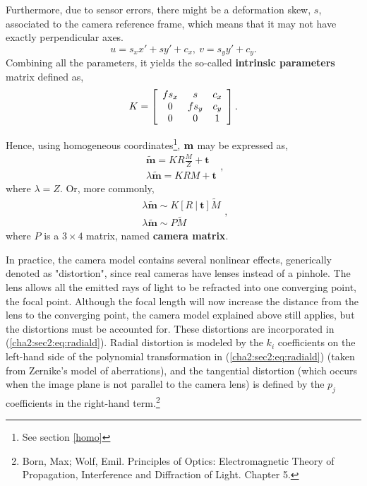 \begin{enumerate}
	Furthermore, due to sensor errors, there might be a deformation skew, $s$, associated to the camera reference frame, which means that it may not have exactly perpendicular axes.
	\begin{equation}
	\label{cha2:sec2:eq:trisimilar}
	u = s_x x' + sy' + c_x, \ v = s_y y' + c_y.
	\end{equation}
	Combining all the parameters, it yields the so-called \textbf{intrinsic parameters} matrix defined as,
	\begin{equation}
	\label{sec2:eq:kmatrix}
	K = \left[ 
	\begin{array} { c c c } 
	f s_x & s     & c_x \\ 
	0 	  & f s_y & c_y \\ 
	0     & 0     & 1   
	\end{array} 
	\right].
	\end{equation}
\end{enumerate}
Hence, using homogeneous coordinates\footnote{See section \ref{homo}}, $\bf m$ may be expressed as,
\begin{equation}
\begin{array} { l } 
\mathbf{\widetilde{m}} = K R \frac{M}{Z} + \mathbf{t} \\
\lambda \mathbf{\widetilde{m}} = KR M +  \mathbf{t} 
\end{array},
\end{equation}
where $\lambda = Z$. Or, more commonly, 
\begin{equation}
\begin{array} { l } { \lambda \mathbf{\widetilde{m}} \sim K [ R \ | \ \mathbf{t} ] \widetilde { M } } \\ { \lambda \mathbf{\widetilde{ m }} \sim P \widetilde { M } } \end{array},
\end{equation}
where $P$ is a $3\times4$ matrix, named \textbf{camera matrix}.
	
In practice, the camera model contains several nonlinear effects, generically denoted as "distortion", since real cameras have lenses instead of a pinhole. The lens allows all the emitted rays of light to be refracted into one converging point, the focal point. Although the focal length will now increase the distance from the lens to the converging point, the camera model explained above still applies, but the distortions must be accounted for. These distortions are incorporated in (\ref{cha2:sec2:eq:radiald}). Radial distortion is modeled by the $k_i$ coefficients on the left-hand side of the polynomial transformation in (\ref{cha2:sec2:eq:radiald}) (taken from Zernike's model of aberrations), and the tangential distortion (which occurs when the image plane is not parallel to the camera lens) is defined by the $p_j$ coefficients in the right-hand term.\footnote{Born, Max; Wolf, Emil. Principles of Optics: Electromagnetic Theory of Propagation, Interference and Diffraction of Light. Chapter 5.} 

